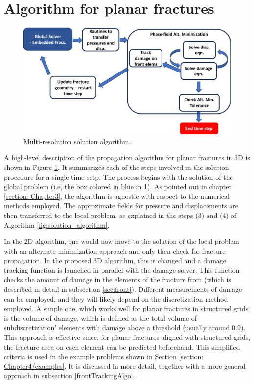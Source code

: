 \section{Algorithm for planar fractures}
\label{section: Chapter4/algo}

\begin{figure}[h]
    \centering
    \includegraphics[width=\linewidth]{Chapter4/figures/planar3D_algorithm.png}
    \caption{Multi-resolution solution algorithm.}
    \label{fig:MR_planar_algo}
\end{figure}

A high-level description of the propagation algorithm for planar fractures in 3D is shown in Figure \ref{fig:MR_planar_algo}. It summarizes each of the steps involved in the solution procedure for a single time-setp. The process begins with the solution of the global problem (i.e, the box colored in blue in \ref{fig:MR_planar_algo}). As pointed out in chapter \ref{section: Chapter3}, the algorithm is agnostic with respect to the numerical methods employed. The approximate fields for pressure and displacements are then transferred to the local problem, as explained in the steps (3) and (4) of Algorithm \ref{fig:solution_algorithm}.

In the 2D algorithm, one would now move to the solution of the local problem with an alternate minimization approach and only then check for fracture propagation. In the proposed 3D algorithm, this is changed and a damage tracking function is launched in parallel with the damage solver. This function checks the amount of damage in the elements of the fracture from (which is described in detail in subsection \ref{sec:front}). Different measurements of damage can be employed, and they will likely depend on the discretization method employed. A simple one, which works well for planar fractures in structured grids is the volume of damage, which is defined as the total volume of subdiscretization' elements with damage above a threshold (usually around 0.9). This approach is effective since, for planar fractures aligned with structured grids, the fracture area on each element can be predicted beforehand. This simplified criteria is used in the example problems shown in Section \ref{section: Chapter4/examples}. It is discussed in more detail, together with a more general approach in subsection \ref{frontTrackingAlgo}.

